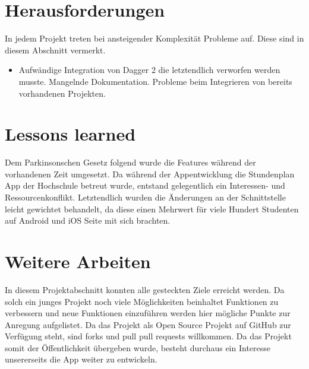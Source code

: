 \documentclass[
    DIV12,
    cleardouble=plain,
    headings=normal,
    pdftex,
    headexclude,footexclude,
    final
]{scrreprt}
\begin{document}
\newpage

\chapter{Herausforderungen}
In jedem Projekt treten bei ansteigender Komplexität Probleme auf. Diese sind in diesem Abschnitt vermerkt.

\begin{itemize}
\item Aufwändige Integration von Dagger 2 die letztendlich verworfen werden musste. Mangelnde Dokumentation. Probleme beim Integrieren von bereits vorhandenen Projekten.
\end{itemize}

\newpage

\chapter{Lessons learned}
Dem Parkinsonschen Gesetz folgend wurde die Features während der vorhandenen Zeit umgesetzt. Da während der Appentwicklung die Stundenplan App der Hochschule betreut wurde, entstand gelegentlich ein Interessen- und Ressourcenkonflikt. Letztendlich wurden die Änderungen an der Schnittstelle leicht gewichtet behandelt, da diese einen Mehrwert für viele Hundert Studenten auf Android und iOS Seite mit sich brachten.


\newpage

\chapter{Weitere Arbeiten}
In diesem Projektabschnitt konnten alle gesteckten Ziele erreicht werden. Da solch ein junges Projekt noch viele Möglichkeiten beinhaltet Funktionen zu verbessern und neue Funktionen einzuführen werden hier mögliche Punkte zur Anregung aufgelistet. Da das Projekt als Open Source Projekt auf GitHub zur Verfügung steht, sind forks und pull pull requests willkommen. Da das Projekt somit der Öffentlichkeit übergeben wurde, besteht durchaus ein Interesse unsererseits die App weiter zu entwickeln.



\newpage


\listoffigures
\end{document}
